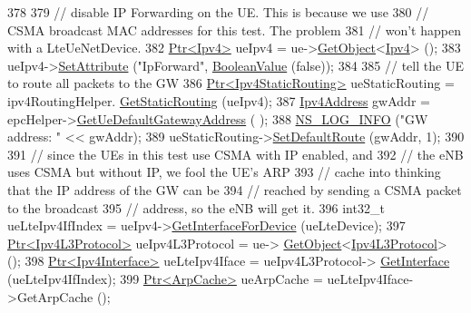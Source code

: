 \begin{DoxyCode}
378 
379           \textcolor{comment}{// disable IP Forwarding on the UE. This is because we use}
380           \textcolor{comment}{// CSMA broadcast MAC addresses for this test. The problem}
381           \textcolor{comment}{// won't happen with a LteUeNetDevice. }
382           \hyperlink{classns3_1_1Ptr}{Ptr<Ipv4>} ueIpv4 = ue->\hyperlink{classns3_1_1Object_a13e18c00017096c8381eb651d5bd0783}{GetObject}<\hyperlink{classns3_1_1Ipv4}{Ipv4}> ();
383           ueIpv4->\hyperlink{classns3_1_1ObjectBase_ac60245d3ea4123bbc9b1d391f1f6592f}{SetAttribute} (\textcolor{stringliteral}{"IpForward"}, \hyperlink{classns3_1_1BooleanValue}{BooleanValue} (\textcolor{keyword}{false}));
384 
385           \textcolor{comment}{// tell the UE to route all packets to the GW}
386           \hyperlink{classns3_1_1Ptr}{Ptr<Ipv4StaticRouting>} ueStaticRouting = ipv4RoutingHelper.
      \hyperlink{classns3_1_1Ipv4StaticRoutingHelper_a731206e50d305695dac7fb2ef963a4bb}{GetStaticRouting} (ueIpv4);
387           \hyperlink{classns3_1_1Ipv4Address}{Ipv4Address} gwAddr = epcHelper->\hyperlink{classns3_1_1PointToPointEpcHelper_a9160d83b92d5ea373abcd627f5d784f5}{GetUeDefaultGatewayAddress} (
      );
388           \hyperlink{group__logging_gafbd73ee2cf9f26b319f49086d8e860fb}{NS\_LOG\_INFO} (\textcolor{stringliteral}{"GW address: "} << gwAddr);
389           ueStaticRouting->\hyperlink{classns3_1_1Ipv4StaticRouting_aee30fa3246c2b42f122dabdff2725331}{SetDefaultRoute} (gwAddr, 1);
390 
391           \textcolor{comment}{// since the UEs in this test use CSMA with IP enabled, and}
392           \textcolor{comment}{// the eNB uses CSMA but without IP, we fool the UE's ARP}
393           \textcolor{comment}{// cache into thinking that the IP address of the GW can be}
394           \textcolor{comment}{// reached by sending a CSMA packet to the broadcast}
395           \textcolor{comment}{// address, so the eNB will get it.       }
396           int32\_t ueLteIpv4IfIndex = ueIpv4->\hyperlink{classns3_1_1Ipv4_ab3ff69819c27af58b02ee4791c94abf7}{GetInterfaceForDevice} (ueLteDevice);
397           \hyperlink{classns3_1_1Ptr}{Ptr<Ipv4L3Protocol>} ueIpv4L3Protocol = ue->
      \hyperlink{classns3_1_1Object_a13e18c00017096c8381eb651d5bd0783}{GetObject}<\hyperlink{classns3_1_1Ipv4L3Protocol}{Ipv4L3Protocol}> ();
398           \hyperlink{classns3_1_1Ptr}{Ptr<Ipv4Interface>} ueLteIpv4Iface = ueIpv4L3Protocol->
      \hyperlink{classns3_1_1Ipv4L3Protocol_ad58abef6f890f3cc2cf291159a3b8588}{GetInterface} (ueLteIpv4IfIndex);
399           \hyperlink{classns3_1_1Ptr}{Ptr<ArpCache>} ueArpCache = ueLteIpv4Iface->GetArpCache (); 

\end{DoxyCode}
